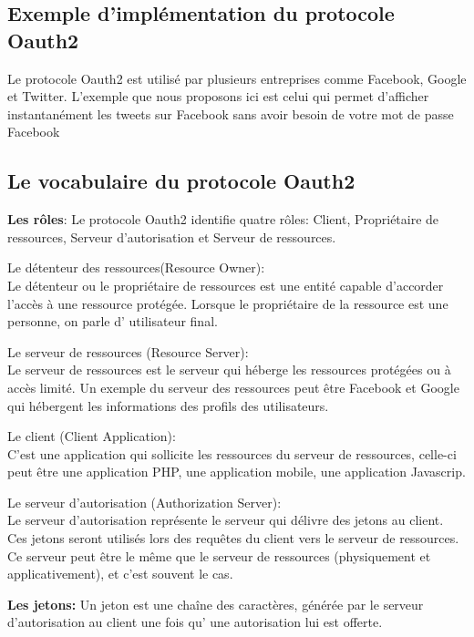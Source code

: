 \subsection{Exemple d’implémentation du protocole Oauth2}

Le protocole Oauth2 est utilisé par plusieurs entreprises comme Facebook, Google et Twitter. L’exemple que nous proposons ici est celui qui permet
d’afficher instantanément les tweets sur Facebook sans avoir besoin de votre mot de passe Facebook

\subsection{Le vocabulaire du protocole Oauth2}
\textbf{Les rôles}: Le protocole Oauth2 identifie quatre rôles: Client, Propriétaire de ressources, Serveur d’autorisation
et Serveur de ressources.
\begin{list}{•}
	\item  Le détenteur des ressources(Resource Owner):\\
	 Le détenteur ou le propriétaire de ressources est
	une entité capable d’accorder l’accès à une ressource protégée. Lorsque le propriétaire de la ressource est une personne, on parle d’ utilisateur final.

	\item Le serveur de ressources (Resource Server):\\
	Le serveur de ressources est le serveur qui héberge
	les ressources protégées ou à accès limité. Un exemple du serveur des ressources peut être Facebook et Google qui hébergent les informations des profils des utilisateurs.
	\item Le client (Client Application): \\
	C’est une application qui sollicite les ressources du serveur de
	ressources, celle-ci peut être une application PHP, une application mobile, une application Javascrip.
	\item Le serveur d’autorisation (Authorization Server):\\
	Le serveur d’autorisation représente le serveur
	qui délivre des jetons au client. Ces jetons seront utilisés lors des requêtes du client vers le serveur de ressources. Ce serveur peut être le même que le serveur de ressources (physiquement et applicativement), et c’est souvent le cas.
\end{list}
\textbf{Les jetons:} Un jeton est une chaîne des caractères, générée par le serveur d’autorisation au client une fois
qu’ une autorisation lui est offerte.
